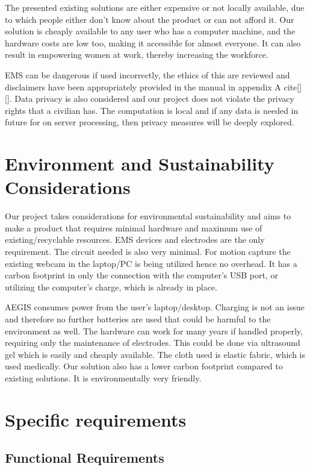 The presented existing solutions are either expensive or not locally available, due to which people either don't know about the product or can not afford it. 
Our solution is cheaply available to any user who has a computer machine, and the hardware costs are low too, making it accessible for almost everyone. It can also result in empowering women at work, thereby increasing the workforce.  


EMS can be dangerous if used incorrectly, the ethics of this are reviewed and disclaimers have been appropriately provided in the manual in appendix A cite[][]. Data privacy is also considered and our project does not violate the privacy rights that a civilian has. The computation is local and if any data is needed in future for on server processing, then privacy measures will be deeply explored.

\section{Environment and Sustainability Considerations}

Our project takes considerations for environmental sustainability and aims to make a product that requires minimal hardware and maximum use of existing/recyclable resources. EMS devices and electrodes are the only requirement. The circuit needed is also very minimal. For motion capture the existing webcam in the laptop/PC is being utilized hence no overhead. It has a carbon footprint in only the connection with the computer's USB port, or utilizing the computer's charge, which is already in place. 


AEGIS consumes power from the user's laptop/desktop. Charging is not an issue and therefore no further batteries are used that could be harmful to the environment as well.
The hardware can work for many years if handled properly, requiring only the maintenance of electrodes. This could be done via ultrasound gel which is easily and cheaply available. The cloth used is elastic fabric, which is used medically. Our solution also has a lower carbon footprint compared to existing solutions. It is environmentally very friendly.

\section{Specific requirements}

\subsection{Functional Requirements}


